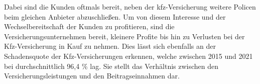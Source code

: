 Dabei sind die Kunden oftmals bereit, neben der \ac{kfz}-Versicherung weitere Policen beim gleichen Anbieter abzuschließen. Um von diesem Interesse und der Wechselbereitschaft der Kunden zu profitieren, sind die Versicherungsunternehmen bereit, kleinere Profite bis hin zu Verlusten bei der Kfz-Versicherung in Kauf zu nehmen.\autocite[Vgl.][]{HARTUNG2019} Dies lässt sich ebenfalls an der Schadensquote der Kfz-Versicherungen erkennen, welche zwischen 2015 und 2021 bei durchschnittlich 96,4 \% lag. Sie stellt das Verhältnis zwischen den Versicherungsleistungen und den Beitragseinnahmen dar.\autocite[Vgl.][]{GDVKFZ}  



\newpage
